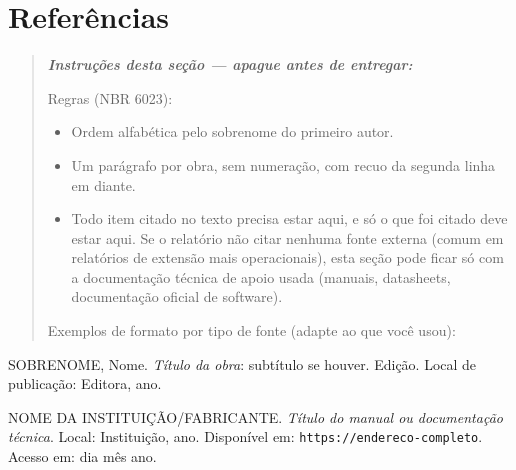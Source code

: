 \documentclass[article,12pt,a4paper,oneside]{abntex2}
\newenvironment{instrucoes}{%
  \begin{quotation}\footnotesize\itshape
  \noindent\textbf{\upshape Instruções desta seção — apague antes de entregar:}\par\smallskip
}{%
  \end{quotation}
}
\begin{document}
\section*{Referências}

\begin{instrucoes}
Regras (NBR 6023):
\begin{itemize}
  \item Ordem alfabética pelo sobrenome do primeiro autor.
  \item Um parágrafo por obra, sem numeração, com recuo da segunda linha em diante.
  \item Todo item citado no texto precisa estar aqui, e só o que foi citado deve estar aqui. Se o relatório não citar nenhuma fonte externa (comum em relatórios de extensão mais operacionais), esta seção pode ficar só com a documentação técnica de apoio usada (manuais, datasheets, documentação oficial de software).
\end{itemize}
Exemplos de formato por tipo de fonte (adapte ao que você usou):
\end{instrucoes}

\newcommand{\referencia}[1]{\par\noindent\hangindent=1cm #1\par\medskip}

\referencia{SOBRENOME, Nome. \textit{Título da obra}: subtítulo se houver.
Edição. Local de publicação: Editora, ano.}

\referencia{NOME DA INSTITUIÇÃO/FABRICANTE. \textit{Título do manual ou
documentação técnica}. Local: Instituição, ano. Disponível em:
\texttt{https://endereco-completo}. Acesso em: dia mês ano.}
\end{document}
